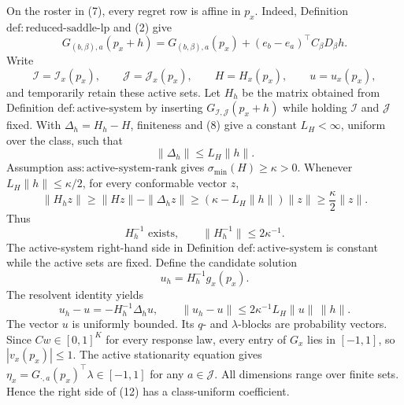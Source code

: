 On the roster in (7), every regret row is affine in \(p_x\).  Indeed,
Definition \(\mathrm{def{:}reduced\mbox{-}saddle\mbox{-}lp}\) and (2) give
\[
 G_{(b,\beta),a}(p_x+h)
 =G_{(b,\beta),a}(p_x)
   +(e_b-e_a)^\top C_\beta D_\beta h.
 \tag{8}
\]
Write
\[
 \mathcal I=\mathcal I_x(p_x),\qquad
 \mathcal J=\mathcal J_x(p_x),\qquad
 H=H_x(p_x),\qquad u=u_x(p_x),
\]
and temporarily retain these active sets.  Let \(H_h\) be the matrix obtained
from Definition \(\mathrm{def{:}active\mbox{-}system}\) by inserting
\(G_{\mathcal I,\mathcal J}(p_x+h)\) while holding \(\mathcal I\) and
\(\mathcal J\) fixed.  With \(\Delta_h=H_h-H\), finiteness and (8) give a
constant \(L_H<\infty\), uniform over the class, such that
\[
 \|\Delta_h\|\leq L_H\|h\|.
 \tag{9}
\]
Assumption \(\mathrm{ass{:}active\mbox{-}system\mbox{-}rank}\) gives
\(\sigma_{\min}(H)\geq\kappa>0\).  Whenever
\(L_H\|h\|\leq\kappa/2\), for every conformable vector \(z\),
\[
 \|H_hz\|\geq\|Hz\|-\|\Delta_hz\|
 \geq(\kappa-L_H\|h\|)\|z\|
 \geq\frac{\kappa}{2}\|z\|.
\]
Thus
\[
 H_h^{-1}\text{ exists},\qquad \|H_h^{-1}\|\leq2\kappa^{-1}.
 \tag{10}
\]
The active-system right-hand side in Definition
\(\mathrm{def{:}active\mbox{-}system}\) is constant while the active sets are
fixed.  Define the candidate solution
\[
 u_h=H_h^{-1}g_x(p_x).
 \tag{11}
\]
The resolvent identity yields
\[
 u_h-u=-H_h^{-1}\Delta_hu,
 \qquad
 \|u_h-u\|\leq2\kappa^{-1}L_H\|u\|\,\|h\|.
 \tag{12}
\]
The vector \(u\) is uniformly bounded.  Its \(q\)- and \(\lambda\)-blocks
are probability vectors.  Since \(Cw\in[0,1]^K\) for every response law,
every entry of \(G_x\) lies in \([-1,1]\), so \(|v_x(p_x)|\leq1\).
The active stationarity equation gives
\(\eta_x=G_{\cdot,a}(p_x)^\top\lambda\in[-1,1]\) for any
\(a\in\mathcal J\).  All dimensions range over finite sets.  Hence the
right side of (12) has a class-uniform coefficient.


